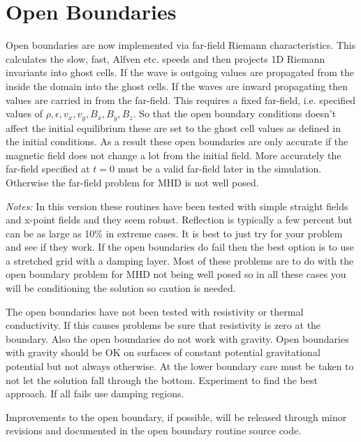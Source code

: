 \documentclass[11pt]{article}
\begin{document}

\section{Open  Boundaries} %
\label{sec:open_bcs}
Open boundaries are now implemented via far-field Riemann characteristics. This calculates the slow, fast, Alfven etc. speeds and then projects 1D Riemann invariants into ghost cells. If the wave is outgoing values are propagated from the inside the domain into the ghost cells. If the waves are inward propagating then values are carried in from the far-field. This requires a fixed far-field, i.e. specified values of $\rho, \epsilon, v_x, v_y, B_x, B_y, B_z$. So that the open boundary conditions doesn't affect the initial equilibrium these are set to the ghost cell values as defined in the initial conditions. As a result these open boundaries are only accurate if the magnetic field does not change a lot from the initial field. More accurately the far-field specified at $t=0$ must be a valid far-field later in the simulation. Otherwise the far-field problem for MHD is not well posed.

{\it Notes:} In this version these routines have been tested with simple straight fields and x-point fields and they seem robust. Reflection is typically a few percent but can be as large as 10\% in extreme cases. It is best to just try for your problem and see if they work. If the open boundaries do fail then the best option is to use a stretched grid with a damping layer. Most of these problems are to do with the open boundary problem for MHD not being well posed so in all these cases you will be conditioning the solution so caution is needed.

The open boundaries have not been tested with resistivity or thermal conductivity. If this causes problems be sure that resistivity is zero at the boundary. Also the open boundaries do not work with gravity. Open boundaries with gravity should be OK on surfaces of constant potential gravitational potential but not always otherwise. At the lower boundary care must be taken to not let the solution fall through the bottom. Experiment to find the best approach. If all fails use damping regions.

Improvements to the open boundary, if possible, will be released through minor revisions and documented in the
open boundary routine source code.

\end{document}
